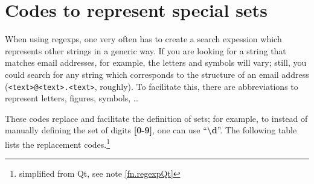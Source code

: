 \section{Codes to represent special sets}

When using regexps, one very often has to create a search expession which represents other strings in a generic way. If you are looking for a string that matches email addresses, for example, the letters and symbols will vary; still, you could search for any string which corresponds to the structure of an email address (\texttt{<text>@<text>.<text>}, roughly). To facilitate this, there are abbreviations to represent letters, figures, symbols, \dots 

These codes replace and facilitate the definition of sets; for example, to instead of manually defining the set of digits \textbf{[0-9]}, one can use ``\textbf{\textbackslash{}d}''. The following table lists the replacement codes.\footnote{simplified from Qt, see note \ref{fn.regexpQt}}
\smallskip

